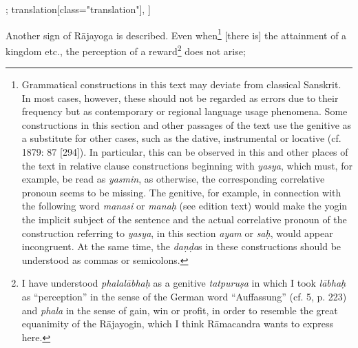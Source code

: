 \begin{alignment}[
  texts=edition[class="edition"];
  translation[class="translation"],
  ]
\begin{translation}
\begin{tlate}[p17_01]
      Another sign of Rājayoga is described. Even when\footnote{Grammatical constructions in this text may deviate from classical Sanskrit. In most cases, however, these should not be regarded as errors due to their frequency but as contemporary or regional language usage phenomena. Some constructions in this section and other passages of the text use the genitive as a substitute for other cases, such as the dative, instrumental or locative (cf. \citeauthor{whitney1879} 1879: 87 [294]). In particular, this can be observed in this and other places of the text in relative clause constructions beginning with \textit{yasya}, which must, for example, be read as \textit{yasmin}, as otherwise, the corresponding correlative pronoun seems to be missing. The genitive, for example, in connection with the following word \textit{manasi} or \textit{manaḥ} (see edition text) would make the yogin the implicit subject of the sentence and the actual correlative pronoun of the construction referring to \textit{yasya}, in this section \textit{ayam} or \textit{saḥ}, would appear incongruent. At the same time, the \textit{daṇḍa}s in these constructions should be understood as commas or semicolons.} [there is] the attainment of a kingdom etc., the perception of a reward\footnote{I have understood \textit{phalalābhaḥ} as a genitive \textit{tatpuruṣa} in which I took \textit{lābhaḥ} as ``perception'' in the sense of the German word ``Auffassung'' (cf.  5, p. 223) and \textit{phala} in the sense of gain, win or profit, in order to resemble the great equanimity of the Rājayogin, which I think Rāmacandra wants to express here.} does not arise;%

\end{tlate}
\end{translation}
\end{alignment}
